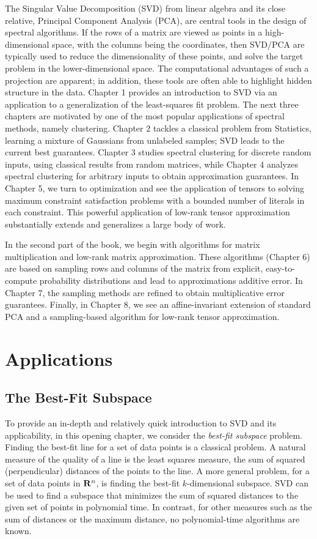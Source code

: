\documentclass{book}
\numberwithin{exercise}{chapter}
\begin{document}
The Singular Value Decomposition (SVD) from linear algebra and its close relative,
Principal Component Analysis (PCA), are central tools in the design of spectral algorithms.
If the rows of a matrix are viewed as points in a high-dimensional space, with the columns being the
coordinates, then SVD/PCA are typically used to reduce the dimensionality of these points, and solve
the target problem in the lower-dimensional space. The
computational advantages of such a projection are apparent; in addition, these tools are often
able to highlight hidden structure in the data. Chapter 1 provides an introduction to SVD via an application
to a generalization of the least-squares fit problem. The next three chapters are motivated by one of the most popular applications of spectral methods, namely clustering. Chapter 2 tackles a classical problem from Statistics,
learning a mixture of Gaussians from unlabeled samples; SVD leads to the current best guarantees. Chapter 3 studies
spectral clustering for discrete random inputs, using classical results from random matrices, while Chapter 4 analyzes spectral
clustering for arbitrary inputs to obtain approximation guarantees. In Chapter 5, we turn to optimization and see the application of tensors to
solving maximum constraint satisfaction problems with a bounded number of literals in each constraint. This powerful
application of low-rank tensor approximation substantially extends and generalizes a large body of work.

In the second part of the book, we begin with algorithms for matrix multiplication and low-rank matrix approximation.
These algorithms (Chapter 6) are based on sampling rows and columns of the matrix from explicit, easy-to-compute probability distributions
and lead to approximations additive error. In Chapter 7, the sampling methods are refined to obtain multiplicative error guarantees.
Finally, in Chapter 8, we see an affine-invariant extension of standard PCA and a sampling-based algorithm for low-rank
tensor approximation.

\part{Applications}
\chapter{The Best-Fit Subspace}

To provide an in-depth and relatively quick introduction to SVD and its applicability,
in this opening chapter, we consider the {\em best-fit subspace} problem.
Finding the best-fit line for a set of data points
is a classical problem.
A natural measure of the quality of a line is
the least squares measure, the sum of squared
(perpendicular) distances of the points to the line. A more general problem,
for a set of data points in ${\bf R}^n$, is finding the best-fit
$k$-dimensional subspace. SVD can be used to find a subspace that minimizes the
sum of squared distances to the given set of points in polynomial time.
In contrast, for other measures such as the sum of distances or the maximum
distance, no polynomial-time algorithms are known.
\end{document}
